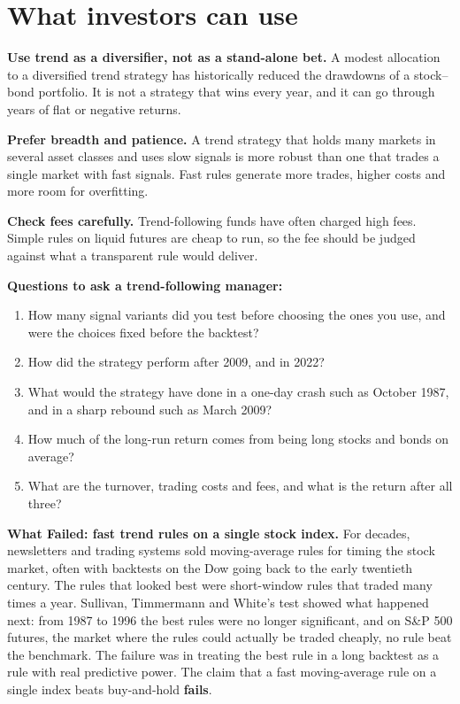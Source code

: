 \section{What investors can use}
\label{sec:09-investors}

\textbf{Use trend as a diversifier, not as a stand-alone bet.} A modest allocation to a diversified trend strategy has historically reduced the drawdowns of a stock--bond portfolio. It is not a strategy that wins every year, and it can go through years of flat or negative returns.

\textbf{Prefer breadth and patience.} A trend strategy that holds many markets in several asset classes and uses slow signals is more robust than one that trades a single market with fast signals. Fast rules generate more trades, higher costs and more room for overfitting.

\textbf{Check fees carefully.} Trend-following funds have often charged high fees. Simple rules on liquid futures are cheap to run, so the fee should be judged against what a transparent rule would deliver.

\textbf{Questions to ask a trend-following manager:}

\begin{enumerate}
  \item How many signal variants did you test before choosing the ones you use, and were the choices fixed before the backtest?
  \item How did the strategy perform after 2009, and in 2022?
  \item What would the strategy have done in a one-day crash such as October 1987, and in a sharp rebound such as March 2009?
  \item How much of the long-run return comes from being long stocks and bonds on average?
  \item What are the turnover, trading costs and fees, and what is the return after all three?
\end{enumerate}

\begin{callout}
\textbf{What Failed: fast trend rules on a single stock index.} For decades, newsletters and trading systems sold moving-average rules for timing the stock market, often with backtests on the Dow going back to the early twentieth century. The rules that looked best were short-window rules that traded many times a year. Sullivan, Timmermann and White's test showed what happened next: from 1987 to 1996 the best rules were no longer significant, and on S\&P 500 futures, the market where the rules could actually be traded cheaply, no rule beat the benchmark. The failure was in treating the best rule in a long backtest as a rule with real predictive power. The claim that a fast moving-average rule on a single index beats buy-and-hold \textbf{fails}.
\end{callout}

